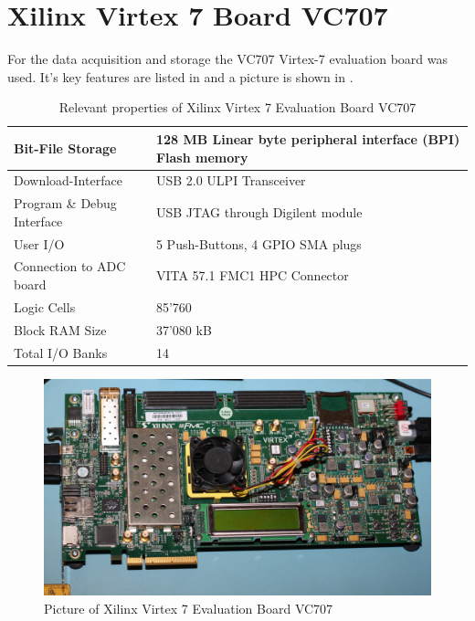\section{Xilinx Virtex 7 Board VC707}
\label{sec:comp_vc707}
For the data acquisition and storage the VC707 Virtex-7 evaluation board
was used. It's key features are listed in  and a
picture is shown in .


\begin{table}[h]
  \centering
  \begin{tabular}{|l|l|}
    \hline
    Bit-File Storage & 128 MB Linear byte peripheral interface (BPI) Flash memory \\ \hline
    Download-Interface & USB 2.0 ULPI Transceiver \\ \hline
    Program \& Debug Interface & USB JTAG through Digilent module \\ \hline
    User I/O & 5 Push-Buttons, 4 GPIO SMA plugs \\ \hline
    Connection to \gls{ADC} board & VITA 57.1 FMC1 HPC Connector \\ \hline
    Logic Cells & 85'760 \\ \hline
    Block RAM Size &  37'080 kB \\ \hline
    Total I/O Banks & 14 \\ \hline
  \end{tabular}
  \caption{Relevant properties of Xilinx Virtex 7 Evaluation Board VC707
    \cite{xilinx_virtex7_overview, xilinx_vc707}}
  \label{tab:comp_vc707}
\end{table}

\begin{figure}[p]
  \centering
  \includegraphics[width=\textwidth]{pictures/vc707}
  \caption{Picture of Xilinx Virtex 7 Evaluation Board VC707}
  \label{fig:comp_vc707_pic}
\end{figure}

